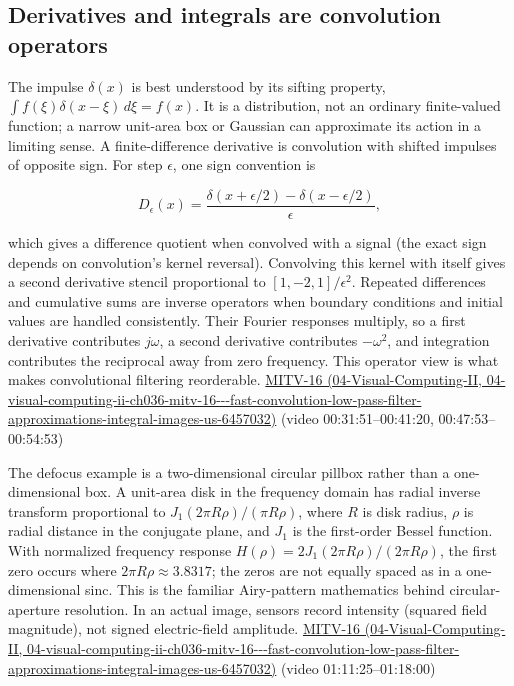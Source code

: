 \subsection{Derivatives and integrals are convolution operators}\label{03-visual-computing-i-ch004-derivatives-and-integrals-are-convolution-operators}

The impulse \(\delta(x)\) is best understood by its sifting property, \(\int f(\xi)\delta(x-\xi)\,d\xi=f(x)\). It is a distribution, not an ordinary finite-valued function; a narrow unit-area box or Gaussian can approximate its action in a limiting sense. A finite-difference derivative is convolution with shifted impulses of opposite sign. For step \(\epsilon\), one sign convention is

\[
D_\epsilon(x)=\frac{\delta(x+\epsilon/2)-\delta(x-\epsilon/2)}{\epsilon},
\]

which gives a difference quotient when convolved with a signal (the exact sign depends on convolution's kernel reversal). Convolving this kernel with itself gives a second derivative stencil proportional to \([1,-2,1]/\epsilon^2\). Repeated differences and cumulative sums are inverse operators when boundary conditions and initial values are handled consistently. Their Fourier responses multiply, so a first derivative contributes \(j\omega\), a second derivative contributes \(-\omega^2\), and integration contributes the reciprocal away from zero frequency. This operator view is what makes convolutional filtering reorderable. \href{../04-Visual-Computing-II/main.pdf\#nameddest=04-visual-computing-ii-ch036-mitv-16---fast-convolution-low-pass-filter-approximations-integral-images-us-6457032}{MITV-16 (04-Visual-Computing-II, 04-visual-computing-ii-ch036-mitv-16-\/-\/-fast-convolution-low-pass-filter-approximations-integral-images-us-6457032)} (video 00:31:51--00:41:20, 00:47:53--00:54:53)

The defocus example is a two-dimensional circular pillbox rather than a one-dimensional box. A unit-area disk in the frequency domain has radial inverse transform proportional to \(J_1(2\pi R\rho)/(\pi R\rho)\), where \(R\) is disk radius, \(\rho\) is radial distance in the conjugate plane, and \(J_1\) is the first-order Bessel function. With normalized frequency response \(H(\rho)=2J_1(2\pi R\rho)/(2\pi R\rho)\), the first zero occurs where \(2\pi R\rho\approx3.8317\); the zeros are not equally spaced as in a one-dimensional sinc. This is the familiar Airy-pattern mathematics behind circular-aperture resolution. In an actual image, sensors record intensity (squared field magnitude), not signed electric-field amplitude. \href{../04-Visual-Computing-II/main.pdf\#nameddest=04-visual-computing-ii-ch036-mitv-16---fast-convolution-low-pass-filter-approximations-integral-images-us-6457032}{MITV-16 (04-Visual-Computing-II, 04-visual-computing-ii-ch036-mitv-16-\/-\/-fast-convolution-low-pass-filter-approximations-integral-images-us-6457032)} (video 01:11:25--01:18:00)

